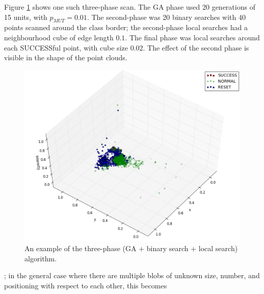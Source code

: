 \documentclass[times, utf8, diplomski]{fer}
\begin{document}
Figure \ref{fig:three-phase-example} shows one such three-phase scan. The GA
phase used 20 generations of 15 units, with $p_{MUT}=0.01$. The second-phase
was 20 binary searches with 40 points scanned around the class border; the
second-phase local searches had a neighbourhood cube of edge length $0.1$.
The final phase was local searches around each SUCCESSful point, with cube
size $0.02$. The effect of the second phase is visible in the shape of the
point clouds.


\begin{figure}[htbp]
    \centering
    \includegraphics[width=\textwidth]{images/GA-binary-local.png}
    \caption{An example of the three-phase (GA + binary search + local search)
             algorithm.
    }
    \label{fig:three-phase-example}
\end{figure}


; in the general case where there are multiple blobs
of unknown size, number, and positioning with respect to each other, this
becomes
\end{document}

